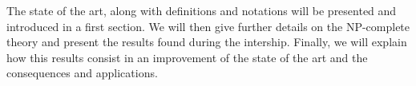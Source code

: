 The state of the art, along with definitions and notations will be
presented and introduced in a first section. We will then give further
details on the NP-complete theory and present the results found during
the intership. Finally, we will explain how this results consist in an
improvement of the state of the art and the consequences and
applications.
